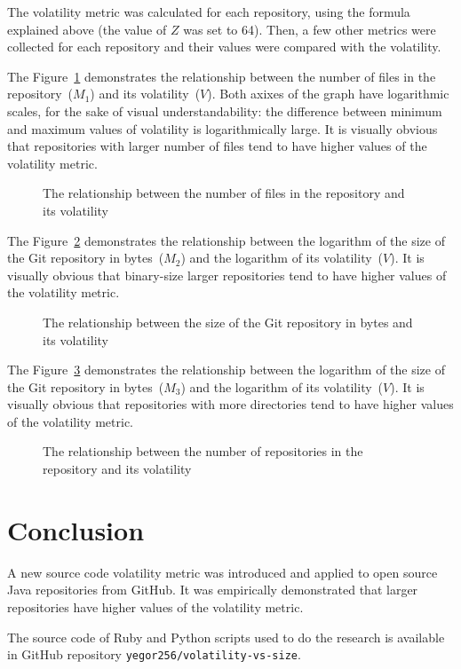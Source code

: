 \documentclass[12pt]{article}
\begin{document}
The volatility metric was calculated for each repository, using the
formula explained above (the value of $Z$ was set to 64).
Then, a few other metrics were collected
for each repository and their values were compared with the volatility.

The Figure~\ref{fig:1} demonstrates the relationship between
the number of files in the repository~($M_1$) and its volatility~($V$). Both
axixes of the graph have logarithmic scales, for the sake of visual
understandability: the difference between minimum and maximum values
of volatility is logarithmically large. It is visually obvious that
repositories with larger number of files tend to have higher values
of the volatility metric.

\begin{figure}[h]
  
  \caption{The relationship between the number of files in the repository and its volatility}
  \label{fig:1}
\end{figure}

The Figure~\ref{fig:2} demonstrates the relationship between
the logarithm of the size of the Git repository in bytes~($M_2$) and
the logarithm of its volatility~($V$).
It is visually obvious that
binary-size larger repositories tend to have higher values
of the volatility metric.

\begin{figure}[h]
  
  \caption{The relationship between the size of the Git repository in bytes and its volatility}
  \label{fig:2}
\end{figure}

The Figure~\ref{fig:3} demonstrates the relationship between
the logarithm of the size of the Git repository in bytes~($M_3$) and
the logarithm of its volatility~($V$).
It is visually obvious that
repositories with more directories tend to have higher values
of the volatility metric.

\begin{figure}[h]
  
  \caption{The relationship between the number of repositories in the repository and its volatility}
  \label{fig:3}
\end{figure}

\section{Conclusion}

A new source code volatility metric was introduced and applied
to \thetotalrepos{} open source Java repositories from GitHub. It was
empirically demonstrated that larger repositories have higher values
of the volatility metric.

The source code of Ruby and Python scripts used to do the research
is available in GitHub repository \texttt{yegor256/volatility-vs-size}.


\end{document}
